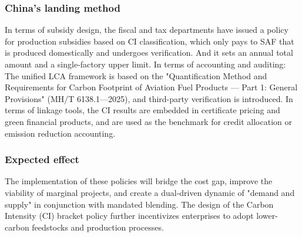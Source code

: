 \documentclass[a4paper,11pt]{article}
\begin{document}
\subsubsection{China's landing method}
In terms of subsidy design, the fiscal and tax departments have issued a policy for production subsidies based on CI classification, which only pays to SAF that is produced domestically and undergoes verification. And it sets an annual total amount and a single-factory upper limit. In terms of accounting and auditing: The unified LCA framework is based on the "Quantification Method and Requirements for Carbon Footprint of Aviation Fuel Products --- Part 1: General Provisions" (MH/T 6138.1---2025), and third-party verification is introduced. In terms of linkage tools, the CI results are embedded in certificate pricing and green financial products, and are used as the benchmark for credit allocation or emission reduction accounting.

\subsubsection{Expected effect}
The implementation of these policies will bridge the cost gap, improve the viability of marginal projects, and create a dual-driven dynamic of "demand and supply" in conjunction with mandated blending. The design of the Carbon Intensity (CI) bracket policy further incentivizes enterprises to adopt lower-carbon feedstocks and production processes.
\end{document}
